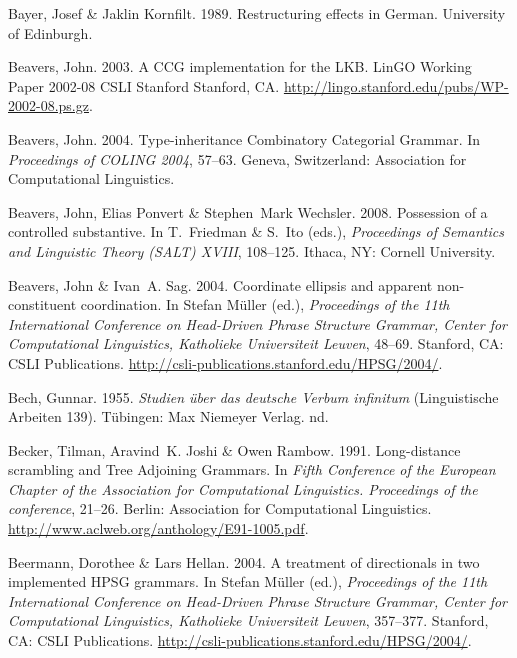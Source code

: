 \begin{thebibliography}{1420}
Bayer, Josef \& Jaklin Kornfilt. 1989.
\newblock Restructuring effects in {German}.
 University of Edinburgh.

Beavers, John. 2003.
\newblock A {CCG} implementation for the {LKB}.
\newblock LinGO Working Paper 2002-08 CSLI Stanford Stanford, CA.
\newblock \urlprefix\url{http://lingo.stanford.edu/pubs/WP-2002-08.ps.gz}.

Beavers, John. 2004.
\newblock Type-inheritance {Combinatory Categorial Grammar}.
\newblock In \emph{Proceedings of {COLING} 2004}, 57--63. Geneva, Switzerland:
  Association for Computational Linguistics.

Beavers, John, Elias Ponvert \& Stephen~Mark Wechsler. 2008.
\newblock Possession of a controlled substantive.
\newblock In T.~Friedman \& S.~Ito (eds.), \emph{Proceedings of {Semantics and
  Linguistic Theory (SALT)} {XVIII}}, 108--125. Ithaca, NY: Cornell University.

Beavers, John \& Ivan~A. Sag. 2004.
\newblock Coordinate ellipsis and apparent non-constituent coordination.
\newblock In Stefan M{\"u}ller (ed.), \emph{Proceedings of the {11th
  International Conference on Head-Driven Phrase Structure Grammar, Center for
  Computational Linguistics, Katholieke Universiteit Leuven}}, 48--69.
  Stanford, CA: CSLI Publications.
\newblock \urlprefix\url{http://csli-publications.stanford.edu/HPSG/2004/}.

Bech, Gunnar. 1955.
\newblock \emph{{Studien {\"u}ber das deutsche Verbum infinitum}}
  (Linguistische Arbeiten 139).
\newblock T{\"u}bingen: Max Niemeyer Verlag.
\newblock \2nd.

Becker, Tilman, Aravind~K. Joshi \& Owen Rambow. 1991.
\newblock Long-distance scrambling and {Tree Adjoining Grammars}.
\newblock In \emph{{Fifth Conference of the European Chapter of the Association
  for Computational Linguistics. Proceedings} of the conference}, 21--26.
  Berlin: Association for Computational Linguistics.
\newblock \urlprefix\url{http://www.aclweb.org/anthology/E91-1005.pdf}.

Beermann, Dorothee \& Lars Hellan. 2004.
\newblock A treatment of directionals in two implemented {HPSG} grammars.
\newblock In Stefan M{\"u}ller (ed.), \emph{Proceedings of the {11th
  International Conference on Head-Driven Phrase Structure Grammar, Center for
  Computational Linguistics, Katholieke Universiteit Leuven}}, 357--377.
  Stanford, CA: CSLI Publications.
\newblock \urlprefix\url{http://csli-publications.stanford.edu/HPSG/2004/}.


\end{thebibliography}
